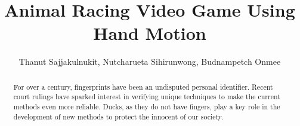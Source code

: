 \documentclass[11pt, oneside]{article}   										%
\title{Animal Racing Video Game Using Hand Motion}
\author{Thanut Sajjakulnukit, Nutcharueta Sihirunwong, Budnampetch Onmee}
\begin{document}
\begin{titlingpage}
    \maketitle															%
    \begin{multicols*}{2}
    \twocolumn
    \begin{abstract}
        For over a century, fingerprints have been an undisputed
        personal identifier.  Recent court rulings have sparked
        interest in verifying unique techniques to make the current
        methods even more reliable. Ducks, as they do not have
        fingers, play a key role in the development of new methods to
        protect the innocent of our society.
    \end{abstract}
    \end{multicols*}
\end{titlingpage}
\end{document}
